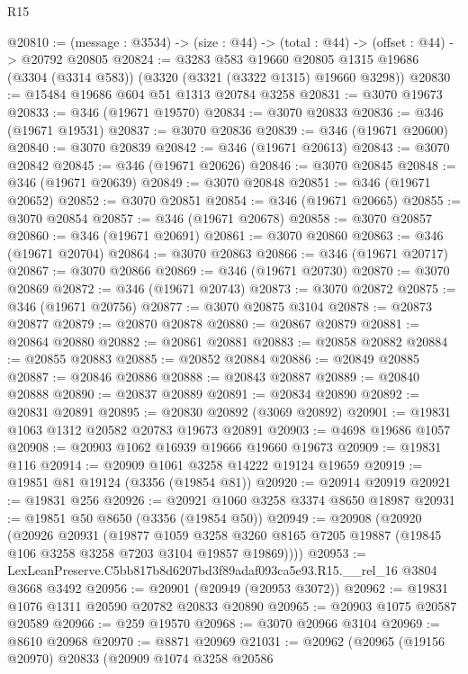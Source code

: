 \begin{lexlean}{R15}
\begin{coremodule}
@20810 := (message : @3534) -> (size : @44) -> (total : @44) -> (offset : @44) -> @20792 @20805
@20824 := @3283
    @583
    @19660
    @20805
    @1315
    @19686
    (@3304 (@3314 @583))
    (@3320 (@3321 (@3322 @1315) @19660 @3298))
@20830 := @15484 @19686 @604 @51 @1313 @20784 @3258
@20831 := @3070 @19673
@20833 := @346 (@19671 @19570)
@20834 := @3070 @20833
@20836 := @346 (@19671 @19531)
@20837 := @3070 @20836
@20839 := @346 (@19671 @20600)
@20840 := @3070 @20839
@20842 := @346 (@19671 @20613)
@20843 := @3070 @20842
@20845 := @346 (@19671 @20626)
@20846 := @3070 @20845
@20848 := @346 (@19671 @20639)
@20849 := @3070 @20848
@20851 := @346 (@19671 @20652)
@20852 := @3070 @20851
@20854 := @346 (@19671 @20665)
@20855 := @3070 @20854
@20857 := @346 (@19671 @20678)
@20858 := @3070 @20857
@20860 := @346 (@19671 @20691)
@20861 := @3070 @20860
@20863 := @346 (@19671 @20704)
@20864 := @3070 @20863
@20866 := @346 (@19671 @20717)
@20867 := @3070 @20866
@20869 := @346 (@19671 @20730)
@20870 := @3070 @20869
@20872 := @346 (@19671 @20743)
@20873 := @3070 @20872
@20875 := @346 (@19671 @20756)
@20877 := @3070 @20875 @3104
@20878 := @20873 @20877
@20879 := @20870 @20878
@20880 := @20867 @20879
@20881 := @20864 @20880
@20882 := @20861 @20881
@20883 := @20858 @20882
@20884 := @20855 @20883
@20885 := @20852 @20884
@20886 := @20849 @20885
@20887 := @20846 @20886
@20888 := @20843 @20887
@20889 := @20840 @20888
@20890 := @20837 @20889
@20891 := @20834 @20890
@20892 := @20831 @20891
@20895 := @20830 @20892 (@3069 @20892)
@20901 := @19831 @1063 @1312 @20582 @20783 @19673 @20891
@20903 := @4698 @19686 @1057
@20908 := @20903 @1062 @16939 @19666 @19660 @19673
@20909 := @19831 @116
@20914 := @20909 @1061 @3258 @14222 @19124 @19659
@20919 := @19851 @81 @19124 (@3356 (@19854 @81))
@20920 := @20914 @20919
@20921 := @19831 @256
@20926 := @20921 @1060 @3258 @3374 @8650 @18987
@20931 := @19851 @50 @8650 (@3356 (@19854 @50))
@20949 := @20908
    (@20920
      (@20926
        @20931
        (@19877
          @1059
          @3258
          @3260
          @8165
          @7205
          @19887
          (@19845 @106 @3258 @3258 @7203 @3104 @19857 @19869))))
@20953 := LexLeanPreserve.C5bb817b8d6207bd3f89adaf093ca5e93.R15.__rel_16 @3804 @3668 @3492
@20956 := @20901 (@20949 (@20953 @3072))
@20962 := @19831 @1076 @1311 @20590 @20782 @20833 @20890
@20965 := @20903 @1075 @20587 @20589
@20966 := @259 @19570
@20968 := @3070 @20966 @3104
@20969 := @8610 @20968
@20970 := @8871 @20969
@21031 := @20962
    (@20965
      (@19156 @20970)
      @20833
      (@20909
        @1074
        @3258
        @20586

\end{coremodule}
\end{lexlean}
